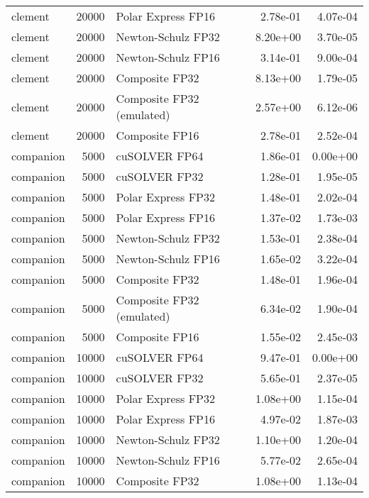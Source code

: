 \begin{table}
\begin{tabular}{lrlrr}
  clement & 20000 &        Polar Express FP16 &  2.78e-01 &        4.07e-04 \\
  clement & 20000 &        Newton-Schulz FP32 &  8.20e+00 &        3.70e-05 \\
  clement & 20000 &        Newton-Schulz FP16 &  3.14e-01 &        9.00e-04 \\
  clement & 20000 &            Composite FP32 &  8.13e+00 &        1.79e-05 \\
  clement & 20000 & Composite FP32 (emulated) &  2.57e+00 &        6.12e-06 \\
  clement & 20000 &            Composite FP16 &  2.78e-01 &        2.52e-04 \\
companion &  5000 &             cuSOLVER FP64 &  1.86e-01 &        0.00e+00 \\
companion &  5000 &             cuSOLVER FP32 &  1.28e-01 &        1.95e-05 \\
companion &  5000 &        Polar Express FP32 &  1.48e-01 &        2.02e-04 \\
companion &  5000 &        Polar Express FP16 &  1.37e-02 &        1.73e-03 \\
companion &  5000 &        Newton-Schulz FP32 &  1.53e-01 &        2.38e-04 \\
companion &  5000 &        Newton-Schulz FP16 &  1.65e-02 &        3.22e-04 \\
companion &  5000 &            Composite FP32 &  1.48e-01 &        1.96e-04 \\
companion &  5000 & Composite FP32 (emulated) &  6.34e-02 &        1.90e-04 \\
companion &  5000 &            Composite FP16 &  1.55e-02 &        2.45e-03 \\
companion & 10000 &             cuSOLVER FP64 &  9.47e-01 &        0.00e+00 \\
companion & 10000 &             cuSOLVER FP32 &  5.65e-01 &        2.37e-05 \\
companion & 10000 &        Polar Express FP32 &  1.08e+00 &        1.15e-04 \\
companion & 10000 &        Polar Express FP16 &  4.97e-02 &        1.87e-03 \\
companion & 10000 &        Newton-Schulz FP32 &  1.10e+00 &        1.20e-04 \\
companion & 10000 &        Newton-Schulz FP16 &  5.77e-02 &        2.65e-04 \\
companion & 10000 &            Composite FP32 &  1.08e+00 &        1.13e-04 \\

\end{tabular}
\end{table}
